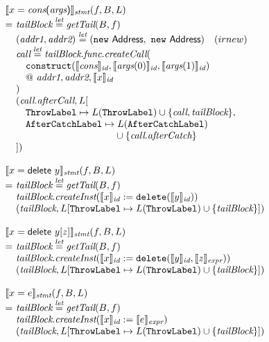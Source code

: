 \[\begin{array}{l@{}l@{~}l}
\lefteqn{\transfun{\ircfgnew{x}{\emph{cons}}{\emph{args}}}_{\emph{stmt}}(f, B, L)}\\
& = & \emph{tailBlock} \letval \getTail(B, f)\\
& & (\emph{addr1}, \emph{addr2}) \letval (\new\ \Address,\ \new\ \Address)\quad (irnew) \\
& & \emph{call} \letval \emph{tailBlock}.\emph{func}.\emph{createCall}(\\
& & \quad \TT{construct}(\transfun{\emph{cons}}_{\emph{id}}, \transfun{\emph{args}(0)}_{\emph{id}}, \transfun{\emph{args}(1)}_{\emph{id}})\\
& & \phantom{\quad }
@~ \emph{addr1}, \emph{addr2}, \transfun{x}_{\emph{id}}\\
& & )\\
& & (\emph{call}.\emph{afterCall}, L[\\
& & \quad \ThrowLabel \mapsto L(\ThrowLabel) \cup \{ \emph{call}, \emph{tailBlock} \},\\
& & \quad \AfterCatchLabel \mapsto L(\AfterCatchLabel)\\
& & \phantom{\quad \AfterCatchLabel \mapsto}
\cup \{ \emph{call}.\emph{afterCatch} \}\\
& & ])\\
& & \\

\lefteqn{\transfun{\irdelete{x}{y}}_{\emph{stmt}}(f, B, L)}\\
& = & \emph{tailBlock} \letval \getTail(B, f)\\
& & \emph{tailBlock}.\emph{createInst}(\transfun{x}_{\emph{id}} := \TT{delete}(\transfun{y}_{\emph{id}}))\\
& & (\emph{tailBlock}, L[\ThrowLabel \mapsto L(\ThrowLabel) \cup \{ \emph{tailBlock} \}])\\
& & \\

\lefteqn{\transfun{\irdeleteobj{x}{y}{z}}_{\emph{stmt}}(f, B, L)}\\
& = & \emph{tailBlock} \letval \getTail(B, f)\\
& & \emph{tailBlock}.\emph{createInst}(\transfun{x}_{\emph{id}} := \TT{delete}(\transfun{y}_{\emph{id}}, \transfun{z}_{\emph{expr}}))\\
& & (\emph{tailBlock}, L[\ThrowLabel \mapsto L(\ThrowLabel) \cup \{ \emph{tailBlock} \}])\\
& & \\

\lefteqn{\transfun{\ircfgexpr{x}{e}}_{\emph{stmt}}(f, B, L)}\\
& = & \emph{tailBlock} \letval \getTail(B, f)\\
& & \emph{tailBlock}.\emph{createInst}(\transfun{x}_{\emph{id}} := \transfun{e}_{\emph{expr}})\\
& & (\emph{tailBlock}, L[\ThrowLabel \mapsto L(\ThrowLabel) \cup \{ \emph{tailBlock} \}])\\
& & \\

\end{array}
\]

